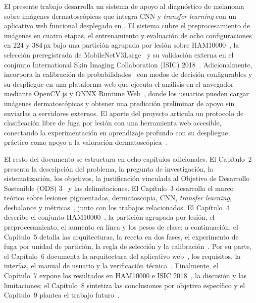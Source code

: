 El presente trabajo desarrolla un sistema de apoyo al diagnóstico de melanoma sobre imágenes dermatoscópicas que integra CNN y \textit{transfer learning} con un aplicativo web funcional desplegado en . El sistema cubre el preprocesamiento de imágenes en cuatro etapas, el entrenamiento y evaluación de ocho configuraciones en 224 y 384\,px bajo una partición agrupada por lesión sobre HAM10000~\cite{tschandl2018ham10000}, la selección preregistrada de MobileNetV3Large~\cite{howard2019mobilenetv3} y su validación externa en el conjunto International Skin Imaging Collaboration (ISIC) 2018~\cite{codella2019isic2018}. Adicionalmente, incorpora la calibración de probabilidades~\cite{guo2017calibration} con modos de decisión configurables y su despliegue en una plataforma web que ejecuta el análisis en el navegador mediante OpenCV.js y ONNX Runtime Web~\cite{ning2024onnxweb}, donde los usuarios pueden cargar imágenes dermatoscópicas y obtener una predicción preliminar de apoyo sin enviarlas a servidores externos. El aporte del proyecto articula un protocolo de clasificación libre de fuga por lesión con una herramienta web accesible, conectando la experimentación en aprendizaje profundo con su despliegue práctico como apoyo a la valoración dermatoscópica~\cite{amaral2025esmo,farias2026}.

El resto del documento se estructura en ocho capítulos adicionales. El Capítulo~2 presenta la descripción del problema, la pregunta de investigación, la sistematización, los objetivos, la justificación vinculada al Objetivo de Desarrollo Sostenible (ODS) 3~\cite{un2024sdg} y las delimitaciones. El Capítulo~3 desarrolla el marco teórico sobre lesiones pigmentadas, dermatoscopia, CNN, \textit{transfer learning}, desbalance y métricas~\cite{maierhein2024metrics}, junto con los trabajos relacionados. El Capítulo~4 describe el conjunto HAM10000~\cite{tschandl2018ham10000}, la partición agrupada por lesión, el preprocesamiento, el aumento en línea y los pesos de clase; a continuación, el Capítulo~5 detalla las arquitecturas, la receta en dos fases, el experimento de fuga por unidad de partición, la regla de selección y la calibración~\cite{guo2017calibration}. Por su parte, el Capítulo~6 documenta la arquitectura del aplicativo web~\cite{ning2024onnxweb}, los requisitos, la interfaz, el manual de usuario y la verificación técnica~\cite{wang2025browser}. Finalmente, el Capítulo~7 expone los resultados en HAM10000 e ISIC 2018~\cite{codella2019isic2018}, la discusión y las limitaciones; el Capítulo~8 sintetiza las conclusiones por objetivo específico y el Capítulo~9 plantea el trabajo futuro~\cite{vasey2022decideai,daneshjou2022disparities,collins2024tripodai}.

